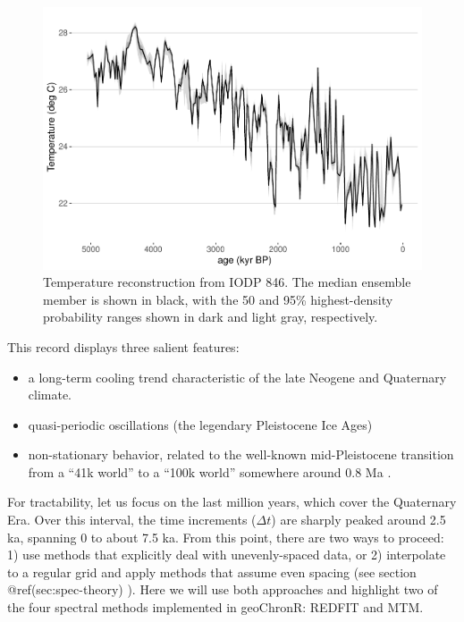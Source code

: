 \documentclass[gchron, manuscript]{copernicus}
\begin{document}
\begin{figure}
\includegraphics[width=12cm]{geoChronR-paper_files/figure-latex/odp846-timeseries-1} \caption{Temperature reconstruction from IODP 846. The median ensemble member is shown in black, with the 50 and 95\% highest-density probability ranges shown in dark and light gray, respectively.}\label{fig:odp846-timeseries}
\end{figure}

This record displays three salient features:

\begin{itemize}
\item
  a long-term cooling trend characteristic of the late Neogene and
  Quaternary climate.
\item
  quasi-periodic oscillations (the legendary Pleistocene Ice Ages)
\item
  non-stationary behavior, related to the well-known mid-Pleistocene
  transition from a ``41k world'' to a ``100k world'' somewhere around
  0.8 Ma \citep{Paillard_2001, LisieckiRaymo05, ahn2017}.
\end{itemize}

For tractability, let us focus on the last million years, which cover
the Quaternary Era. Over this interval, the time increments
(\(\Delta t\)) are sharply peaked around 2.5 ka, spanning 0 to about 7.5
ka. From this point, there are two ways to proceed: 1) use methods that
explicitly deal with unevenly-spaced data, or 2) interpolate to a
regular grid and apply methods that assume even spacing (see section
@ref(sec:spec-theory) ). Here we will use both approaches and highlight
two of the four spectral methods implemented in geoChronR: REDFIT and
MTM.
\end{document}
